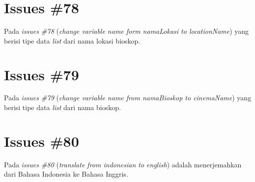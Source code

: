 \section{Issues \#78}
Pada \textit{issues \#78} (\textit{change variable name form namaLokasi to locationName}) yang berisi tipe data \textit{list} dari nama lokasi bioskop.

\section{Issues \#79}
Pada \textit{issues \#79} (\textit{change variable name from namaBioskop to cinemaName}) yang berisi tipe data \textit{list} dari nama bioskop.

\section{Issues \#80}
Pada \textit{issues \#80} (\textit{translate from indonesian to english}) adalah menerjemahkan dari Bahasa Indonesia ke Bahasa Inggris.